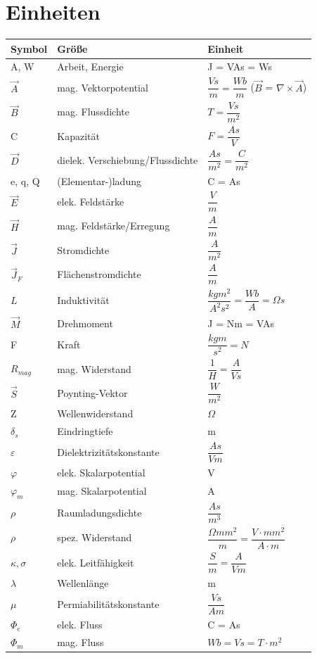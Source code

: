 \section{Einheiten} \label{sec:Einheiten}
\begin{tabular}{l|l|l}
    \hline
    Symbol & Größe & Einheit\\
    \hline 
    A, W & Arbeit, Energie & J = VAs = Ws\\
    $\vec{A}$ & mag. Vektorpotential & $\dfrac{Vs}{m} = \dfrac{Wb}{m}$ ($\vec{B}$ = $\nabla \times \vec{A}$)\\
    $\vec{B}$ & mag. Flussdichte & $T = \dfrac{Vs}{m^2}$\\
    C & Kapazität & $F = \dfrac{As}{V}$\\
    $\vec{D}$ & dielek. Verschiebung/Flussdichte & $\dfrac{As}{m^2} = \dfrac{C}{m^2}$\\
    e, q, Q & (Elementar-)ladung & C = As\\
    $\vec{E}$ & elek. Feldstärke & $\dfrac{V}{m}$ \\
    $\vec{H}$ & mag. Feldstärke/Erregung & $\dfrac{A}{m}$\\
    $\vec{J}$ & Stromdichte & $\dfrac{A}{m^2}$\\
    $\vec{J}_F$ & Flächenstromdichte & $\dfrac{A}{m}$\\
    $L$ & Induktivität & $\dfrac{kgm^2}{A^2s^2} = \dfrac{Wb}{A} = \Omega s$ \\
    $\vec{M}$ & Drehmoment & J = Nm = VAs\\
    F & Kraft & $\dfrac{kgm}{s^2} = N$\\
    $R_{mag}$ & mag. Widerstand & $\dfrac{1}{H} = \dfrac{A}{Vs}$\\
    $\vec{S}$ & Poynting-Vektor & $\dfrac{W}{m^2}$\\
    Z & Wellenwiderstand & $\Omega$\\
    $\delta_s$ & Eindringtiefe & m \\
    $\varepsilon$ & Dielektrizitätskonstante & $\dfrac{As}{Vm}$\\
    $\varphi$ & elek. Skalarpotential & V \\
    $\varphi_m$ & mag. Skalarpotential & A \\
    $\rho$ & Raumladungsdichte & $\dfrac{As}{m^3}$\\
    $\rho$ & spez. Widerstand & $\dfrac{\Omega mm^2}{m} = \dfrac{V \cdot mm^2}{A \cdot m}$\\
    $\kappa, \sigma$ & elek. Leitfähigkeit & $\dfrac{S}{m} = \dfrac{A}{Vm}$\\
    $\lambda$ & Wellenlänge & m\\
    $\mu$ & Permiabilitätskonstante & $\dfrac{Vs}{Am}$\\
    $\Phi_e$ & elek. Fluss & C = As\\
    $\Phi_m$ & mag. Fluss & $Wb = Vs = T \cdot m^2$\\

    \hline
\end{tabular}
